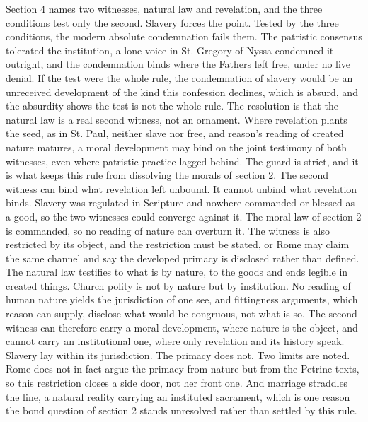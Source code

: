 \documentclass[11pt,twoside]{article}
\newcommand{\unit}[1]{\needspace{3\baselineskip}\par\medskip{\normalfont\bfseries\color{subhead}#1}\par\nobreak\smallskip}
\begin{document}
\unit{The second witness.}
Section 4 names two witnesses, natural law and revelation, and the three conditions test only the second. Slavery forces the point. Tested by the three conditions, the modern absolute condemnation fails them. The patristic consensus tolerated the institution, a lone voice in St. Gregory of Nyssa condemned it outright, and the condemnation binds where the Fathers left free, under no live denial. If the test were the whole rule, the condemnation of slavery would be an unreceived development of the kind this confession declines, which is absurd, and the absurdity shows the test is not the whole rule. The resolution is that the natural law is a real second witness, not an ornament. Where revelation plants the seed, as in St. Paul, neither slave nor free, and reason's reading of created nature matures, a moral development may bind on the joint testimony of both witnesses, even where patristic practice lagged behind. The guard is strict, and it is what keeps this rule from dissolving the morals of section 2. The second witness can bind what revelation left unbound. It cannot unbind what revelation binds. Slavery was regulated in Scripture and nowhere commanded or blessed as a good, so the two witnesses could converge against it. The moral law of section 2 is commanded, so no reading of nature can overturn it. The witness is also restricted by its object, and the restriction must be stated, or Rome may claim the same channel and say the developed primacy is disclosed rather than defined. The natural law testifies to what is by nature, to the goods and ends legible in created things. Church polity is not by nature but by institution. No reading of human nature yields the jurisdiction of one see, and fittingness arguments, which reason can supply, disclose what would be congruous, not what is so. The second witness can therefore carry a moral development, where nature is the object, and cannot carry an institutional one, where only revelation and its history speak. Slavery lay within its jurisdiction. The primacy does not. Two limits are noted. Rome does not in fact argue the primacy from nature but from the Petrine texts, so this restriction closes a side door, not her front one. And marriage straddles the line, a natural reality carrying an instituted sacrament, which is one reason the bond question of section 2 stands unresolved rather than settled by this rule.
\end{document}
